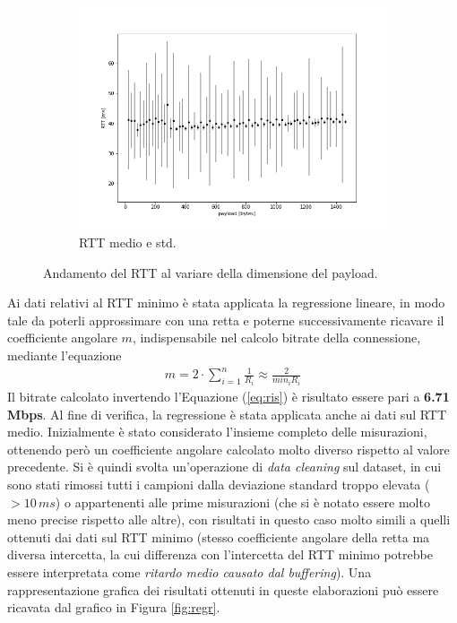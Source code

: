 \documentclass[a4paper,10pt]{article}
\begin{document}
\begin{figure}[h!]
\begin{subfigure}[b]{0.325\textwidth}
         \includegraphics[width=\textwidth]{img/avg.png}
         \caption{RTT medio e std.}
         \label{fig:rttavg}
     \end{subfigure}
        \caption{Andamento del RTT al variare della dimensione del payload.}
        \label{fig:rttfig}
\end{figure}
\noindent
Ai dati relativi al RTT minimo è stata applicata la regressione lineare, in modo tale da poterli approssimare con una retta e poterne successivamente ricavare il coefficiente angolare $m$, indispensabile nel calcolo bitrate della connessione, mediante l'equazione 
\vspace{-0.3cm}
\begin{align}
m = 2 \cdot \sum_{i=1}^{n}  \frac{1}{R_i} \approx \frac{2}{min_i R_i}
\label{eq:ris}
\end{align}
Il bitrate calcolato invertendo l'Equazione (\ref{eq:ris}) è risultato essere pari a \textbf{6.71 Mbps}. Al fine di verifica, la regressione è stata applicata anche ai dati sul RTT medio. Inizialmente è stato considerato l'insieme completo delle misurazioni, ottenendo però un coefficiente angolare calcolato molto diverso rispetto al valore precedente. Si è quindi svolta un'operazione di \textit{data cleaning} sul dataset, in cui sono stati rimossi tutti i campioni dalla deviazione standard troppo elevata ($>10\,ms$) o appartenenti alle prime misurazioni (che si è notato essere molto meno precise rispetto alle altre), con risultati in questo caso molto simili a quelli ottenuti dai dati sul RTT minimo (stesso coefficiente angolare della retta ma diversa intercetta, la cui differenza con l'intercetta del RTT minimo potrebbe essere interpretata come \textit{ritardo medio causato dal buffering}). Una rappresentazione grafica dei risultati ottenuti in queste elaborazioni può essere ricavata dal grafico in Figura \ref{fig:regr}. 
\end{document}
